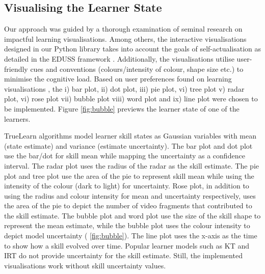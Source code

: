 \documentclass[letterpaper]{article} %
\begin{document}
\subsection{Visualising the Learner State}

Our approach was guided by a thorough examination of seminal research on impactful learning visualisations. Among others, the interactive visualisations designed in our Python library takes into account the goals of self-actualisation as detailed in the EDUSS framework \cite{mti6060042}.
Additionally, the visualisations utilise user-friendly cues and conventions (colours/intensity of colour, shape size etc.) to minimise the cognitive load.
Based on user preferences found on learning visualisations \cite{visualisationscomparison}, the i) bar plot, ii) dot plot, iii) pie plot, vi) tree plot v) radar plot, vi) rose plot vii) bubble plot viii) word plot and ix) line plot were chosen to be implemented. Figure \ref{fig:bubble} previews the learner state of one of the learners.

TrueLearn algorithms model learner skill states as Gaussian variables with mean (state estimate) and variance (estimate uncertainty). The bar plot and dot plot use the bar/dot for skill mean while mapping the uncertainty as a confidence interval. The radar plot uses the radius of the radar as the skill estimate. The pie plot and tree plot use the area of the pie to represent skill mean while using the intensity of the colour (dark to light) for uncertainty. Rose plot, in addition to using the radius and colour intensity for mean and uncertainty respectively, uses the area of the pie to depict the number of video fragments that contributed to the skill estimate. The bubble plot and word plot use the size of the skill shape to represent the mean estimate, while the bubble plot uses the colour intensity to depict model uncertainty (\figurename{ \ref{fig:bubble}}). The line plot uses the x-axis as the time to show how a skill evolved over time. Popular learner models such as KT and IRT do not provide uncertainty for the skill estimate. Still, the implemented visualisations work without skill uncertainty values.
\end{document}
